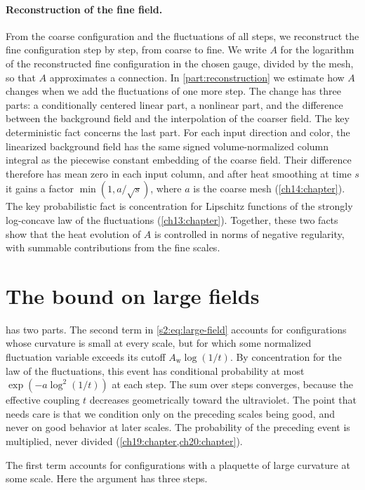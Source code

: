 \paragraph{Reconstruction of the fine field.}
From the coarse configuration and the fluctuations of all steps, we reconstruct the fine configuration step by step, from coarse to fine. We write $A$ for the logarithm of the reconstructed fine configuration in the chosen gauge, divided by the mesh, so that $A$ approximates a connection. In \cref{part:reconstruction} we estimate how $A$ changes when we add the fluctuations of one more step. The change has three parts: a conditionally centered linear part, a nonlinear part, and the difference between the background field and the interpolation of the coarser field. The key deterministic fact concerns the last part. For each input direction and color, the linearized background field has the same signed volume-normalized column integral as the piecewise constant embedding of the coarse field. Their difference therefore has mean zero in each input column, and after heat smoothing at time $s$ it gains a factor $\min(1,a/\sqrt s)$, where $a$ is the coarse mesh (\cref{ch14:chapter}). The key probabilistic fact is concentration for Lipschitz functions of the strongly log-concave law of the fluctuations (\cref{ch13:chapter}). Together, these two facts show that the heat evolution of $A$ is controlled in norms of negative regularity, with summable contributions from the fine scales.

\section{The bound on large fields}\label{s3:largefield}

 has two parts. The second term in \eqref{s2:eq:large-field} accounts for configurations whose curvature is small at every scale, but for which some normalized fluctuation variable exceeds its cutoff $A_{\mathrm w}\log(1/t)$. By concentration for the law of the fluctuations, this event has conditional probability at most $\exp(-a\log^2(1/t))$ at each step. The sum over steps converges, because the effective coupling $t$ decreases geometrically toward the ultraviolet. The point that needs care is that we condition only on the preceding scales being good, and never on good behavior at later scales. The probability of the preceding event is multiplied, never divided (\cref{ch19:chapter,ch20:chapter}).

The first term accounts for configurations with a plaquette of large curvature at some scale. Here the argument has three steps.

